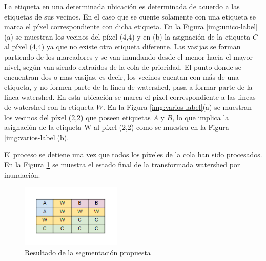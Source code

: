 La etiqueta en una determinada ubicación es determinada de acuerdo a las etiquetas de sus vecinos. En el caso que se cuente solamente con una etiqueta se marca el píxel correspondiente con dicha etiqueta. En la Figura \ref{img:unico-label} (a) se muestran los vecinos del píxel (4,4) y en (b) la asignación de la etiqueta $C$ al píxel (4,4) ya que no existe otra etiqueta diferente. Las vasijas se forman partiendo de los marcadores y se van inundando desde el menor hacia el mayor nivel, según van siendo extraídos de la cola de prioridad. El punto donde se encuentran dos o mas vasijas, es decir, los vecinos cuentan con más de una etiqueta, y no formen parte de la linea de watershed, pasa a formar parte de la linea watershed. En esta ubicación se marca el píxel correspondiente a las lineas de watershed con la etiqueta $W$. 
En la Figura \ref{img:varios-label}(a) se muestran los vecinos del píxel (2,2) que poseen etiquetas $A$ y $B$, lo que implica la asignación de la etiqueta W al píxel (2,2) como se muestra en la Figura \ref{img:varios-label}(b).

El proceso se detiene una vez que todos los píxeles de la cola han sido procesados. En la Figura \ref{img:resultado-final} se muestra el estado final de la transformada watershed por inundación.
\begin{figure}[h!]
\centering
\includegraphics[height=30mm]{./inundacion/resultado-final.png}
\caption{Resultado de la segmentación propuesta}
\label{img:resultado-final}
\end{figure}

